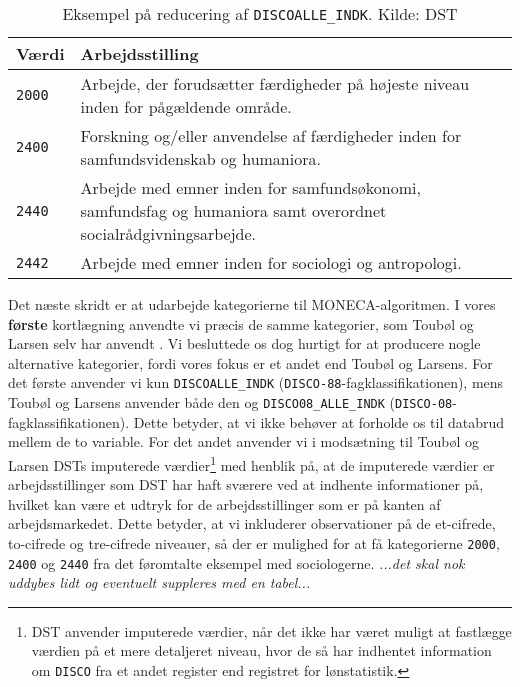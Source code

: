 % 
\begin{table}[H] \centering
\caption{Eksempel på reducering af \texttt{DISCOALLE\_INDK}. Kilde: DST}
\label{tab_reducering}
\begin{tabular}{@{} l m{11cm} @{}} \toprule
Værdi  & Arbejdsstilling \\ \midrule
  \texttt{2000} & Arbejde, der forudsætter færdigheder på højeste niveau inden for pågældende område. \\ 
  \texttt{2400} & Forskning og/eller anvendelse af færdigheder inden for samfundsvidenskab og humaniora. \\ 
  \texttt{2440} & Arbejde med emner inden for samfundsøkonomi, samfundsfag og humaniora samt overordnet socialrådgivningsarbejde. \\ 
  \texttt{2442} & Arbejde med emner inden for sociologi og antropologi. \\ \bottomrule
\end{tabular} \end{table}
%
Det næste skridt er at udarbejde kategorierne til MONECA-algoritmen. I vores \textbf{første} kortlægning anvendte vi præcis de samme kategorier, som Toubøl og Larsen selv har  anvendt \parencite{TouboelLarsen2015}. Vi besluttede os dog hurtigt for at producere nogle alternative kategorier, fordi vores fokus er et andet end Toubøl og Larsens. For det første anvender vi kun \texttt{DISCOALLE\_INDK} (\texttt{DISCO-88}-fagklassifikationen), mens Toubøl og Larsens anvender både den og \texttt{DISCO08\_ALLE\_INDK} (\texttt{DISCO-08}-fagklassifikationen). Dette betyder, at vi ikke behøver at forholde os til databrud mellem de to variable. For det andet anvender vi i modsætning til Toubøl og Larsen DSTs imputerede værdier\footnote{DST anvender imputerede værdier, når det ikke har været muligt at fastlægge værdien på et mere detaljeret niveau, hvor de så har indhentet information om \texttt{DISCO} fra et andet register end registret for lønstatistik.} med henblik på, at de imputerede værdier er arbejdsstillinger som DST har haft sværere ved at indhente informationer på, hvilket kan være et udtryk for de arbejdsstillinger som er på kanten af arbejdsmarkedet. Dette betyder, at vi inkluderer observationer på de et-cifrede, to-cifrede og tre-cifrede niveauer, så der er mulighed for at få kategorierne \texttt{2000}, \texttt{2400} og \texttt{2440} fra det føromtalte eksempel med sociologerne. \emph{...det skal nok uddybes lidt og eventuelt suppleres med en tabel...} %

